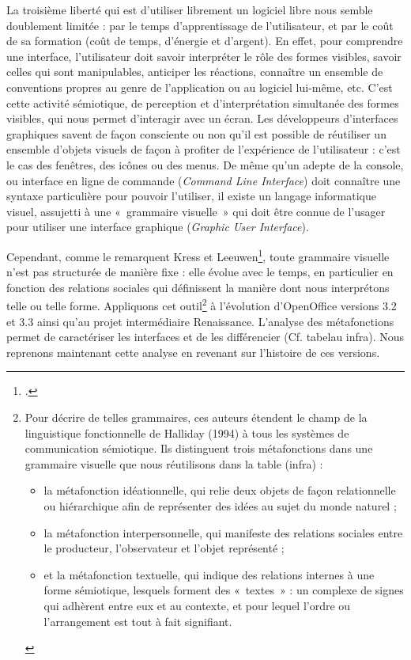 \documentclass{FramateX}
\begin{document}
\begin{refsection}
La troisième liberté qui est d'utiliser librement un logiciel libre nous
semble doublement limitée : par le temps d'apprentissage de
l'utilisateur, et par le coût de sa formation (coût de temps, d'énergie
et d'argent). En effet, pour comprendre une interface, l'utilisateur
doit savoir interpréter le rôle des formes visibles, savoir celles qui
sont manipulables, anticiper les réactions, connaître un ensemble de
conventions propres au genre de l'application ou au logiciel lui-même,
etc. C'est cette activité sémiotique, de perception et d'interprétation
simultanée des formes visibles, qui nous permet d'interagir avec un
écran. Les développeurs d'interfaces graphiques savent de façon
consciente ou non qu'il est possible de réutiliser un ensemble d'objets
visuels de façon à profiter de l'expérience de l'utilisateur : c'est le
cas des fenêtres, des icônes ou des menus. De même qu'un adepte de la
console, ou interface en ligne de commande (\textit{Command Line
Interface}) doit connaître une syntaxe particulière pour pouvoir
l'utiliser, il existe un langage informatique visuel, assujetti à une
«~grammaire visuelle~» qui doit être connue de l'usager pour utiliser
une interface graphique (\textit{Graphic User Interface}).

Cependant, comme le remarquent Kress et Leeuwen\footnote{\cite{kressreading2006}.}, toute grammaire
visuelle n'est pas structurée de manière fixe : elle évolue avec le
temps, en particulier en fonction des relations sociales qui
définissent la manière dont nous interprétons telle ou telle forme.
Appliquons cet outil\footnote{Pour décrire de
telles grammaires, ces auteurs étendent le champ de la linguistique
fonctionnelle de Halliday (1994) à tous les systèmes de communication
sémiotique. Ils distinguent trois métafonctions dans une grammaire
visuelle que nous réutilisons dans la table (infra) : \begin{itemize}
\item la métafonction idéationnelle, qui relie deux objets de façon
relationnelle ou hiérarchique afin de représenter des idées au sujet du
monde naturel ;
\item la métafonction interpersonnelle, qui manifeste des relations
sociales entre le producteur, l'observateur et l'objet représenté ;
\item et la métafonction textuelle, qui indique des relations internes à
une forme sémiotique, lesquels forment des «~textes~» : un complexe de
signes qui adhèrent entre eux et au contexte, et pour lequel l'ordre ou
l'arrangement est tout à fait signifiant.
\end{itemize}
} à l'évolution d'OpenOffice versions 3.2 et 3.3 ainsi qu'au projet
intermédiaire Renaissance. L'analyse des métafonctions permet de
caractériser les interfaces et de les différencier (Cf. tabelau infra). Nous reprenons maintenant cette analyse en
revenant sur l'histoire de ces versions. 


\end{refsection}
\end{document}

